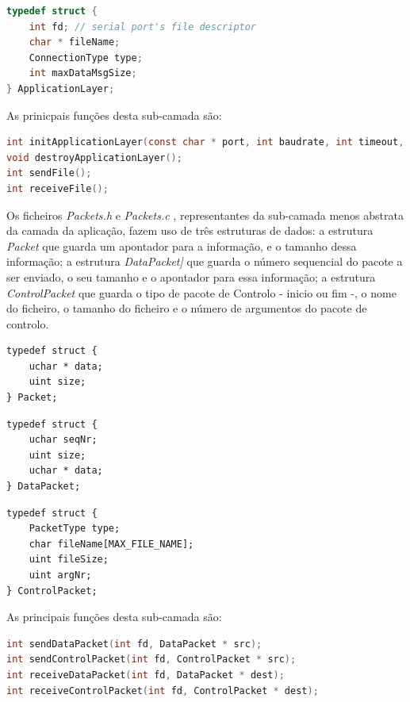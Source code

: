 \documentclass[a4paper, 11pt]{article}
\begin{document}
\begin{lstlisting}[language=C]
typedef struct {
    int fd; // serial port's file descriptor
    char * fileName;
    ConnectionType type;
    int maxDataMsgSize;
} ApplicationLayer;
\end{lstlisting}

As prinicpais funções desta sub-camada são:

\begin{lstlisting}[language=C]
int initApplicationLayer(const char * port, int baudrate, int timeout, int numRetries, ConnectionType type, int maxDataMsgSize, char * file);
void destroyApplicationLayer();
int sendFile();
int receiveFile();
\end{lstlisting}

Os ficheiros \textit{Packets.h} e \textit{Packets.c} , representantes da sub-camada menos abstrata da camada da aplicação, fazem uso de três estruturas de dados: a estrutura \textit{Packet} que guarda um apontador para a informação, e o tamanho dessa informação; a estrutura \textit{DataPacket]} que guarda o número sequencial do pacote a ser enviado, o seu tamanho e o apontador para essa informação; a estrutura \textit{ControlPacket} que guarda o tipo de pacote de Controlo - inicio ou fim -, o nome do ficheiro, o tamanho do ficheiro e o número de argumentos do pacote de controlo.

\noindent\begin{minipage}{.22\textwidth}
\begin{lstlisting}[frame=tlrb]
typedef struct {
    uchar * data;
    uint size;
} Packet;
\end{lstlisting}
\end{minipage}\hfill
\begin{minipage}{.22\textwidth}
\begin{lstlisting}[frame=tlrb]
typedef struct {
    uchar seqNr;
    uint size;
    uchar * data;
} DataPacket;
\end{lstlisting}
\end{minipage}\hfill
\begin{minipage}{.4\textwidth}
\begin{lstlisting}[frame=tlrb]
typedef struct {
    PacketType type;
    char fileName[MAX_FILE_NAME];
    uint fileSize;
    uint argNr;
} ControlPacket;
\end{lstlisting}
\end{minipage}

As principais funções desta sub-camada são:

\begin{lstlisting}[language=C]
int sendDataPacket(int fd, DataPacket * src);
int sendControlPacket(int fd, ControlPacket * src);
int receiveDataPacket(int fd, DataPacket * dest);
int receiveControlPacket(int fd, ControlPacket * dest);
\end{lstlisting}
\end{document}
